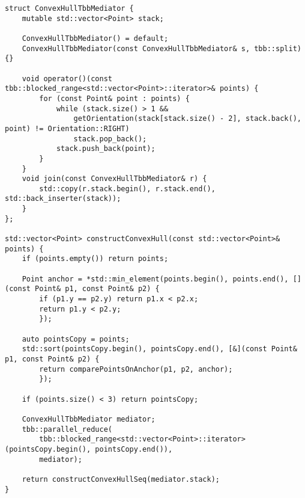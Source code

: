 \documentclass[14pt, a4paper]{extarticle}
\begin{document}
\begin{lstlisting}
struct ConvexHullTbbMediator {
    mutable std::vector<Point> stack;

    ConvexHullTbbMediator() = default;
    ConvexHullTbbMediator(const ConvexHullTbbMediator& s, tbb::split) {}

    void operator()(const tbb::blocked_range<std::vector<Point>::iterator>& points) {
        for (const Point& point : points) {
            while (stack.size() > 1 &&
                getOrientation(stack[stack.size() - 2], stack.back(), point) != Orientation::RIGHT)
                stack.pop_back();
            stack.push_back(point);
        }
    }
    void join(const ConvexHullTbbMediator& r) {
        std::copy(r.stack.begin(), r.stack.end(), std::back_inserter(stack));
    }
};

std::vector<Point> constructConvexHull(const std::vector<Point>& points) {
    if (points.empty()) return points;

    Point anchor = *std::min_element(points.begin(), points.end(), [](const Point& p1, const Point& p2) {
        if (p1.y == p2.y) return p1.x < p2.x;
        return p1.y < p2.y;
        });

    auto pointsCopy = points;
    std::sort(pointsCopy.begin(), pointsCopy.end(), [&](const Point& p1, const Point& p2) {
        return comparePointsOnAnchor(p1, p2, anchor);
        });

    if (points.size() < 3) return pointsCopy;

    ConvexHullTbbMediator mediator;
    tbb::parallel_reduce(
        tbb::blocked_range<std::vector<Point>::iterator>(pointsCopy.begin(), pointsCopy.end()),
        mediator);

    return constructConvexHullSeq(mediator.stack);
}
    \end{lstlisting}
\end{document}
